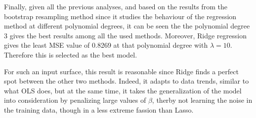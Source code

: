 \documentclass{article}
\begin{document}
Finally, given all the previous analyses, and based on the results from the bootstrap resampling method since it studies the behaviour of the regression method at different polynomial degrees, it can be seen the the polynomial degree 3 gives the best results among all the used methods. Moreover, Ridge regression gives the least MSE value of 0.8269 at that polynomial degree with $\lambda = 10$. Therefore this is selected as the best model.

For such an input surface, this result is reasonable since Ridge finds a perfect spot between the other two methods. Indeed, it adapts to data trends, similar to what OLS does, but at the same time, it takes the generalization of the model into consideration by penalizing large values of $\beta$, therby not learning the noise in the training data, though in a less extreme fassion than Lasso.
\end{document}
